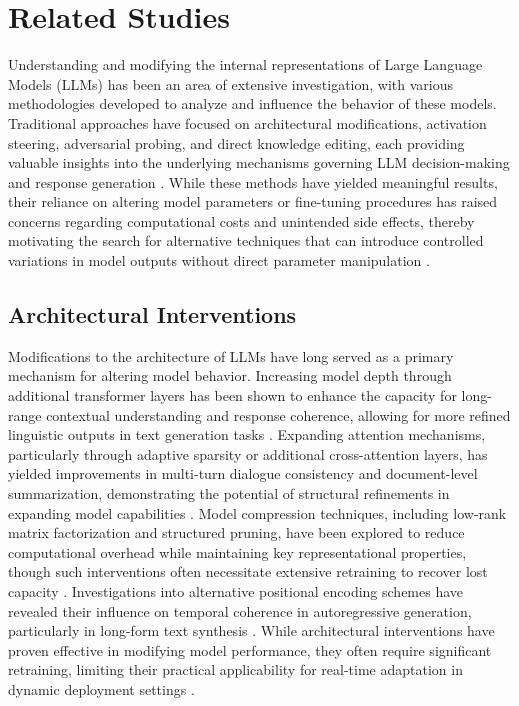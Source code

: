 \section{Related Studies}
Understanding and modifying the internal representations of Large Language Models (LLMs) has been an area of extensive investigation, with various methodologies developed to analyze and influence the behavior of these models. Traditional approaches have focused on architectural modifications, activation steering, adversarial probing, and direct knowledge editing, each providing valuable insights into the underlying mechanisms governing LLM decision-making and response generation \cite{santos2024adaptive}. While these methods have yielded meaningful results, their reliance on altering model parameters or fine-tuning procedures has raised concerns regarding computational costs and unintended side effects, thereby motivating the search for alternative techniques that can introduce controlled variations in model outputs without direct parameter manipulation \cite{higasigi2024novel}. 

\subsection{Architectural Interventions}

Modifications to the architecture of LLMs have long served as a primary mechanism for altering model behavior. Increasing model depth through additional transformer layers has been shown to enhance the capacity for long-range contextual understanding and response coherence, allowing for more refined linguistic outputs in text generation tasks \cite{zablocki2024assessing}. Expanding attention mechanisms, particularly through adaptive sparsity or additional cross-attention layers, has yielded improvements in multi-turn dialogue consistency and document-level summarization, demonstrating the potential of structural refinements in expanding model capabilities \cite{fujiwara2024modify}. Model compression techniques, including low-rank matrix factorization and structured pruning, have been explored to reduce computational overhead while maintaining key representational properties, though such interventions often necessitate extensive retraining to recover lost capacity \cite{meibuki2024improving}. Investigations into alternative positional encoding schemes have revealed their influence on temporal coherence in autoregressive generation, particularly in long-form text synthesis \cite{alouris2024dynamic}. While architectural interventions have proven effective in modifying model performance, they often require significant retraining, limiting their practical applicability for real-time adaptation in dynamic deployment settings \cite{sione2024dynamic}.

